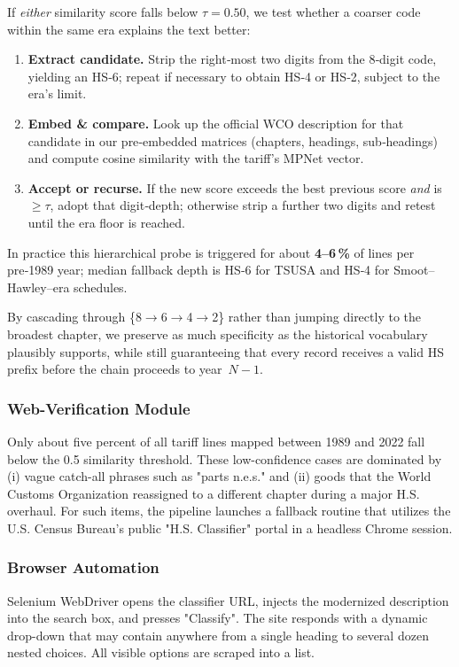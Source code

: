 \documentclass[12pt]{article}
\begin{document}
If \textit{either} similarity score falls below $\tau=0.50$, we test whether a coarser code within the same era
explains the text better:

\begin{enumerate}[leftmargin=1.1cm, itemsep=1pt]
  \item \textbf{Extract candidate.} Strip the right‑most two digits from the 8‑digit code, yielding an HS‑6;
        repeat if necessary to obtain HS‑4 or HS‑2, subject to the era’s limit.
  \item \textbf{Embed \& compare.} Look up the official WCO description for that candidate in our
        pre‑embedded matrices (chapters, headings, sub‑headings) and compute cosine similarity with the
        tariff’s MPNet vector.
  \item \textbf{Accept or recurse.} If the new score exceeds the best previous score \emph{and} is $\ge\tau$,
        adopt that digit‑depth; otherwise strip a further two digits and retest until the era floor is reached.
\end{enumerate}

 In practice this
hierarchical probe is triggered for about \textbf{4–6\,\%} of lines per pre‑1989 year; median fallback depth is HS‑6
for TSUSA and HS‑4 for Smoot–Hawley–era schedules.

By cascading through \{8$\rightarrow$6$\rightarrow$4$\rightarrow$2\} rather than jumping directly to the broadest
chapter, we preserve as much specificity as the historical vocabulary plausibly supports, while still guaranteeing
that every record receives a valid HS prefix before the chain proceeds to year $N{-}1$.


\subsubsection*{Web-Verification Module}
Only about five percent of all tariff lines mapped between 1989 and 2022 fall below the 0.5 similarity threshold. These low-confidence cases are dominated by (i) vague catch-all phrases such as "parts n.e.s." and (ii) goods that the World Customs Organization reassigned to a different chapter during a major H.S. overhaul. For such items, the pipeline launches a fallback routine that utilizes the U.S. Census Bureau's public "H.S. Classifier" portal in a headless Chrome session. 

\subsubsection*{Browser Automation}
Selenium WebDriver opens the classifier URL, injects the modernized description into the search box, and presses "Classify". The site responds with a dynamic drop-down that may contain anywhere from a single heading to several dozen nested choices. All visible options are scraped into a list. 
\end{document}

